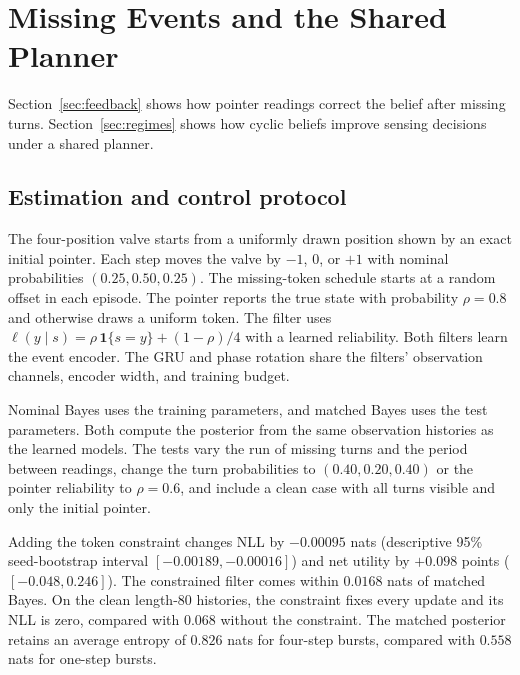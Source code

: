 \section{Missing Events and the Shared Planner}
\label{app:feedbackdetails}
Section~\ref{sec:feedback} shows how pointer readings correct the belief
after missing turns. Section~\ref{sec:regimes} shows how cyclic beliefs
improve sensing decisions under a shared planner.

\subsection{Estimation and control protocol}
The four-position valve starts from a uniformly drawn position shown by an
exact initial pointer. Each step moves the valve by $-1$, $0$, or $+1$ with
nominal probabilities $(0.25,0.50,0.25)$. The missing-token schedule starts
at a random offset in each episode. The pointer reports the true state
with probability $\rho=0.8$ and otherwise draws a uniform token. The filter
uses $\ell(y\mid s)=\rho\,\mathbf{1}\{s=y\}+(1-\rho)/4$ with a learned
reliability. Both filters learn the event encoder. The GRU and phase
rotation share the filters' observation channels, encoder width, and
training budget.

Nominal Bayes uses the training parameters, and matched Bayes uses the test
parameters. Both compute the posterior from the same observation histories
as the learned models. The tests vary the run of missing turns and the period
between readings, change the turn probabilities to $(0.40,0.20,0.40)$ or
the pointer reliability to $\rho=0.6$, and include a clean case with all
turns visible and only the initial pointer.

 Adding the token constraint changes NLL by $-0.00095$ nats (descriptive 95\%
seed-bootstrap interval $[-0.00189,-0.00016]$) and net utility by $+0.098$ points
($[-0.048,0.246]$). The constrained filter comes within $0.0168$ nats of
matched Bayes. On the clean length-80 histories, the constraint fixes every
update and its NLL is zero, compared with $0.068$ without the constraint.
The matched posterior retains an average
entropy of $0.826$ nats for four-step bursts, compared with $0.558$ nats for
one-step bursts.

